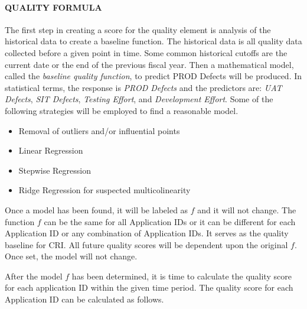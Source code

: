 \documentclass[SDSUThesis.tex]{subfiles}
\begin{document}
            \paragraph{QUALITY FORMULA}
                The first step in creating a score for the quality
                element is analysis of the historical data to create
                a baseline function.  The historical
                data is all quality data collected before  a given point
                in time.  Some common historical cutoffs are the current date
                or the end of the previous fiscal year.  Then a mathematical
                model, called the \textit{baseline quality function},
                to predict PROD Defects will be produced.  In statistical
                terms, the response is \textit{PROD Defects} and the predictors
                are: \textit{UAT Defects}, \textit{SIT Defects}, 
                \textit{Testing Effort}, and \textit{Development Effort}.  
                Some of the following strategies will be employed to find 
                a reasonable model.
                \begin{itemize}
                    \item Removal of outliers and/or influential points
                    \item Linear Regression
                    \item Stepwise Regression
                    \item Ridge Regression for suspected multicolinearity
                \end{itemize}
                
                Once a model has been found, it will be labeled as $f$ and it
                will not change.  The function $f$ can be the same for all 
                Application IDs or it can be different for each Application ID
                or any combination of Application IDs.   It serves as the 
                quality baseline for CRI. 
                All future quality scores will be dependent upon the original
                $f$.  Once set, the model will not change.
                
                After the model $f$ has been determined, it is time
                to calculate the quality score for each application ID
                within the given time period.  The quality score
                for each Application ID can be calculated as follows.
                
\end{document}
